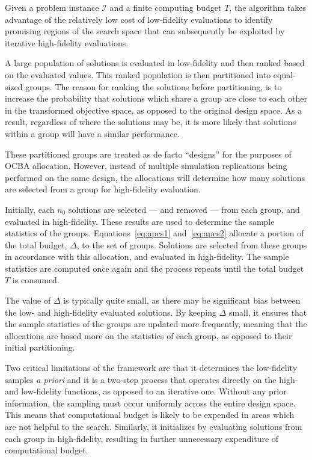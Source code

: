 Given a problem instance $\mathcal{I}$ and a finite computing budget $T$, the \motos{} algorithm takes advantage of the relatively low cost of low-fidelity evaluations to identify promising regions of the search space that can subsequently be exploited by iterative high-fidelity evaluations.

A large population of solutions is evaluated in low-fidelity and then ranked based on the evaluated values. This ranked population is then partitioned into equal-sized groups. The reason for ranking the solutions before partitioning, is to increase the probability that solutions which share a group are close to each other in the transformed objective space, as opposed to the original design space. As a result, regardless of where the solutions may be, it is more likely that solutions within a group will have a similar performance.

These partitioned groups are treated as de facto ``designs'' for the purposes of OCBA allocation. However, instead of multiple simulation replications being performed on the same design, the allocations will determine how many solutions are selected from a group for high-fidelity evaluation.

Initially, each $n_0$ solutions are selected --- and removed --- from each group, and evaluated in high-fidelity. These results are used to determine the sample statistics of the groups. Equations~\ref{eq:apcs1} and~\ref{eq:apcs2} allocate a portion of the total budget, $\Delta$, to the set of groups. Solutions are selected from these groups in accordance with this allocation, and evaluated in high-fidelity. The sample statistics are computed once again and the process repeats until the total budget $T$ is consumed. 

The value of $\Delta$ is typically quite small, as there may be significant bias between the low- and high-fidelity evaluated solutions. By keeping $\Delta$ small, it ensures that the sample statistics of the groups are updated more frequently, meaning that the allocations are based more on the statistics of each group, as opposed to their initial partitioning.

Two critical limitations of the \motos{} framework are that it determines the  low-fidelity samples \emph{a priori} and it is a two-step process that operates directly on the high- and low-fidelity functions, as opposed to an iterative one. Without any prior information, the sampling must occur uniformly across the entire design space. This means that computational budget is likely to be expended in areas which are not helpful to the search. Similarly, it initializes by evaluating solutions from each group in high-fidelity, resulting in further unnecessary expenditure of computational budget.

